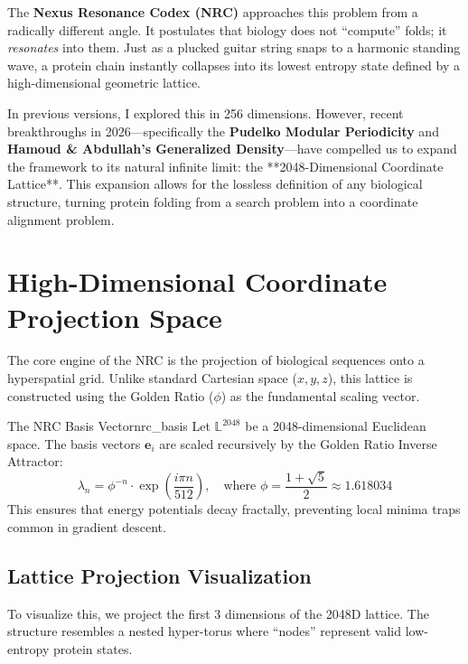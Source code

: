 \documentclass[11pt,a4paper,oneside]{article}
\begin{document}
	The \textbf{Nexus Resonance Codex (NRC)} approaches this problem from a radically different angle. It postulates that biology does not ``compute'' folds; it \textit{resonates} into them. Just as a plucked guitar string snaps to a harmonic standing wave, a protein chain instantly collapses into its lowest entropy state defined by a high-dimensional geometric lattice.

	In previous versions, I explored this in 256 dimensions. However, recent breakthroughs in 2026—specifically the \textbf{Pudelko Modular Periodicity} and \textbf{Hamoud \& Abdullah's Generalized Density}—have compelled us to expand the framework to its natural infinite limit: the **2048-Dimensional Coordinate Lattice**. This expansion allows for the lossless definition of any biological structure, turning protein folding from a search problem into a coordinate alignment problem.

	\section{High-Dimensional Coordinate Projection Space}

	The core engine of the NRC is the projection of biological sequences onto a hyperspatial grid. Unlike standard Cartesian space (\(x, y, z\)), this lattice is constructed using the Golden Ratio (\(\phi\)) as the fundamental scaling vector.

	\begin{definition}{The NRC Basis Vector}{nrc_basis}
		Let \(\mathbb{L}^{2048}\) be a 2048-dimensional Euclidean space. The basis vectors \(\mathbf{e}_i\) are scaled recursively by the Golden Ratio Inverse Attractor:
		\begin{equation}
			\lambda_{n} = \phi^{-n} \cdot \exp\left( \frac{i \pi n}{512} \right), \quad \text{where } \phi = \frac{1 + \sqrt{5}}{2} \approx 1.618034
		\end{equation}
		This ensures that energy potentials decay fractally, preventing local minima traps common in gradient descent.
	\end{definition}

	\subsection{Lattice Projection Visualization}
	To visualize this, we project the first 3 dimensions of the 2048D lattice. The structure resembles a nested hyper-torus where ``nodes'' represent valid low-entropy protein states.
\end{document}

